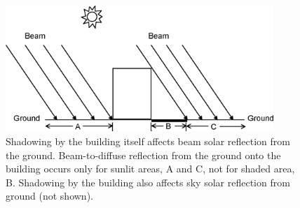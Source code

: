 \begin{figure}[hbtp] %
\centering
\includegraphics[width=0.9\textwidth, height=0.9\textheight, keepaspectratio=true]{media/image672.png}
\caption{Shadowing by the building itself affects beam solar reflection from the ground.  Beam-to-diffuse reflection from the ground onto the building occurs only for sunlit areas, A and C, not for shaded area, B. Shadowing by the building also affects sky solar reflection from ground (not shown). \protect \label{fig:shadowing-by-the-building-itself-affects-beam}}
\end{figure}
